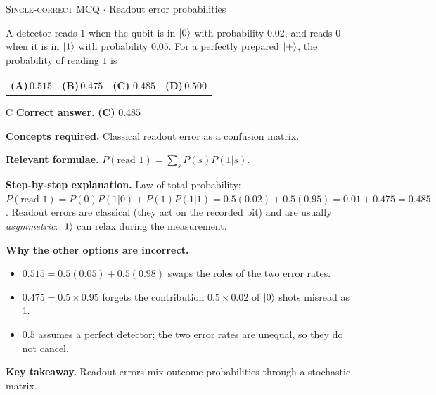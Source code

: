 \documentclass[11pt,a4paper]{article}
\newcommand{\optlabel}[1]{\textbf{(#1)}}
\newcommand{\correctlabel}[1]{\textcolor{okgreen}{\textbf{(#1)}\,\ding{51}}}
\newenvironment{qitem}[1]{\begin{list}{}{\setlength{\leftmargin}{3.3em}\setlength{\labelwidth}{3.1em}%
  \setlength{\labelsep}{0.2em}\setlength{\topsep}{3pt}\setlength{\parsep}{3pt}}\item[\textbf{Q.#1}\hfill]}{\end{list}}
\newcommand{\qsep}{\par\vspace{2pt}{\color{black!15}\hrule}\vspace{4pt}}
\newcommand{\qmeta}[2]{{\footnotesize\color{black!60}\textsc{#1} \;$\cdot$\; #2}\par}
\begin{document}
\begin{qitem}{30}
\qmeta{Single-correct MCQ}{Readout error probabilities}
A detector reads $1$ when the qubit is in $\ket0$ with probability $0.02$, and reads $0$ when it is in $\ket1$ with probability $0.05$. For a perfectly
prepared $\ket+$, the probability of reading $1$ is
\par\smallskip\noindent\begin{tabularx}{\linewidth}{@{}*{4}{L}@{}}
\optlabel{A}\,$0.515$ & \optlabel{B}\,$0.475$ & \correctlabel{C}\,$0.485$ & \optlabel{D}\,$0.500$
\end{tabularx}
\end{qitem}
\begin{solbox}{C}
\textbf{\color{brand}Correct answer.} \textcolor{okgreen}{\textbf{(C)}} $0.485$

\textbf{\color{brand}Concepts required.} Classical readout error as a confusion matrix.

\textbf{\color{brand}Relevant formulae.} $P(\text{read }1) = \sum_sP(s)P(1|s)$.

\textbf{\color{brand}Step-by-step explanation.} Law of total probability: $P(\text{read }1) = P(0)P(1|0) + P(1)P(1|1) = 0.5(0.02) + 0.5(0.95) = 0.01 + 0.475 = 0.485$.
Readout errors are classical (they act on the recorded bit) and are usually \emph{asymmetric}: $\ket1$ can relax during the measurement.

\textbf{\color{brand}Why the other options are incorrect.}
\begin{itemize}[leftmargin=2.4em, itemsep=1pt, topsep=2pt]
\item[\textbf{(A)}] $0.515 = 0.5(0.05) + 0.5(0.98)$ swaps the roles of the two error rates.
\item[\textbf{(B)}] $0.475 = 0.5\times0.95$ forgets the contribution $0.5\times0.02$ of $\ket0$ shots misread as 1.
\item[\textbf{(D)}] $0.5$ assumes a perfect detector; the two error rates are unequal, so they do not cancel.
\end{itemize}
\textbf{\color{brand}Key takeaway.} Readout errors mix outcome probabilities through a stochastic matrix.
\end{solbox}
\qsep
\end{document}
